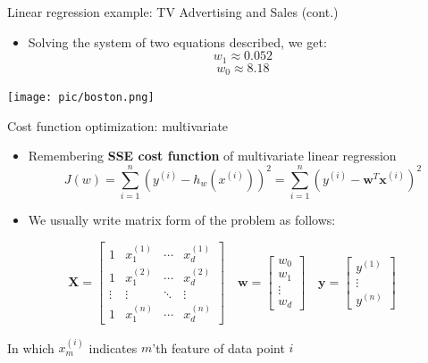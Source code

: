 \documentclass[serif, aspectratio=169]{beamer}
\begin{document}
\begin{frame}{Linear regression example: TV Advertising and Sales (cont.)}
\begin{minipage}{0.4\textwidth}
    \begin{itemize}
        \item Solving the system of two equations described, we get:
        \[ w_1 \approx 0.052 \]
        \[ w_0 \approx 8.18 \]
    \end{itemize}
\end{minipage}%
\begin{minipage}{0.55\textwidth}
\centering
\texttt{[image: pic/boston.png]}
\end{minipage}

\end{frame}

\begin{frame}{Cost function optimization: multivariate}
    \begin{itemize}
        \item Remembering \textbf{SSE cost function} of multivariate linear regression
            \[
            J(w) = \sum_{i=1}^{n} \left( y^{(i)} - h_w(x^{(i)}) \right)^2 = \sum_{i=1}^{n} \left( y^{(i)} - \mathbf{w}^T \mathbf{x}^{(i)} \right)^2
            \]
        \item We usually write matrix form of the problem as follows:

    \end{itemize}

    \[
    \mathbf{X} =
    \begin{bmatrix}
    1 & x_1^{(1)} & \cdots & x_d^{(1)} \\
    1 & x_1^{(2)} & \cdots & x_d^{(2)} \\
    \vdots & \vdots & \ddots & \vdots \\
    1 & x_1^{(n)} & \cdots & x_d^{(n)}
    \end{bmatrix}
    \quad
    \mathbf{w} =
    \begin{bmatrix}
    w_0 \\
    w_1 \\
    \vdots \\
    w_d
    \end{bmatrix}
    \quad
    \mathbf{y} =
    \begin{bmatrix}
    y^{(1)} \\
    \vdots \\
    y^{(n)}
    \end{bmatrix}
    \]

    \begin{center}
    In which \( x_m^{(i)} \) indicates \(m \)'th feature of data point \( i\) \\
    \end{center}

\end{frame}
\end{document}
